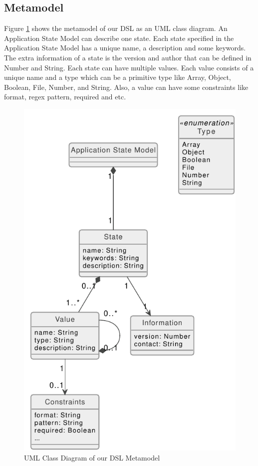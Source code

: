 \subsection{Metamodel}
Figure \ref{fig:asml-meta-model} shows the metamodel of our DSL as an UML class diagram. An Application State Model can describe one state. Each state specified in the Application State Model has a unique name, a description and some keywords. The extra information of a state is the version and author that can be defined in Number and String. Each state can have multiple values. Each value consists of a unique name and a type which can be a primitive type like Array, Object, Boolean, File, Number, and String. Also, a value can have some constraints like format, regex pattern, required and etc.

\FloatBarrier
\begin{figure}
    \includegraphics[scale=1]{../figures/asml-class-diagram.pdf}
    \centering
    \caption{UML Class Diagram of our DSL Metamodel}
    \label{fig:asml-meta-model}
\end{figure}
\FloatBarrier

